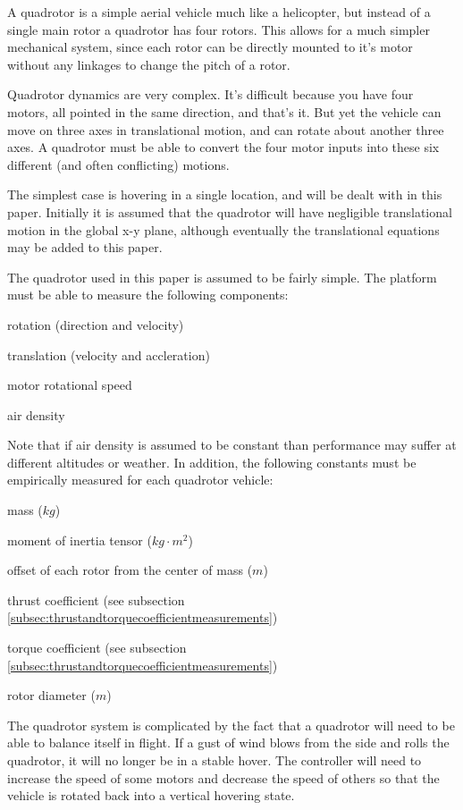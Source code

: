 \documentclass{article}
\numberwithin{equation}{section} %
\begin{document}
A quadrotor is a simple aerial vehicle much like a helicopter, but instead of a single main rotor a quadrotor has four rotors. This allows for a much simpler mechanical system, since each rotor can be directly mounted to it's motor without any linkages to change the pitch of a rotor.

Quadrotor dynamics are very complex. It's difficult because you have four motors, all pointed in the same direction, and that's it. But yet the vehicle can move on three axes in translational motion, and can rotate about another three axes. A quadrotor must be able to convert the four motor inputs into these six different (and often conflicting) motions.

The simplest case is hovering in a single location, and will be dealt with in this paper. Initially it is assumed that the quadrotor will have negligible translational motion in the global x-y plane, although eventually the translational equations may be added to this paper.

The quadrotor used in this paper is assumed to be fairly simple. The platform must be able to measure the following components:
\begin{list}{*}{}
	\item rotation (direction and velocity)
	\item translation (velocity and accleration)
	\item motor rotational speed
	\item air density
\end{list}
Note that if air density is assumed to be constant than performance may suffer at different altitudes or weather. In addition, the following constants must be empirically measured for each quadrotor vehicle:
\begin{list}{*}{}
	\item mass ($kg$)
	\item moment of inertia tensor ($kg \cdot m^2$)
	\item offset of each rotor from the center of mass ($m$)
	\item thrust coefficient (see subsection \ref{subsec:thrustandtorquecoefficientmeasurements})
	\item torque coefficient (see subsection \ref{subsec:thrustandtorquecoefficientmeasurements})
	\item rotor diameter ($m$)
\end{list}

The quadrotor system is complicated by the fact that a quadrotor will need to be able to balance itself in flight. If a gust of wind blows from the side and rolls the quadrotor, it will no longer be in a stable hover. The controller will need to increase the speed of some motors and decrease the speed of others so that the vehicle is rotated back into a vertical hovering state.
\end{document}

